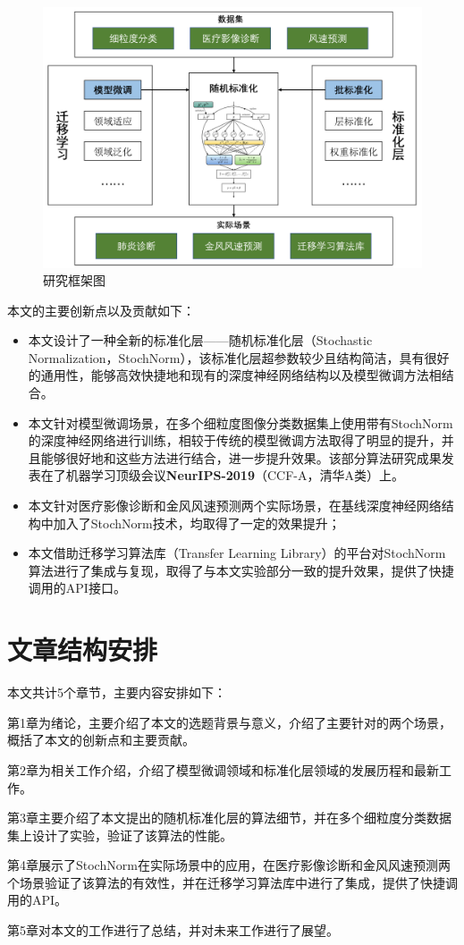 \begin{figure}
    \centering
    \includegraphics[width=\linewidth]{figures/绪论/arch.png}
    \caption{研究框架图}
    \label{fig:research}
\end{figure}

本文的主要创新点以及贡献如下：
\begin{itemize}
    \item 本文设计了一种全新的标准化层——随机标准化层（Stochastic Normalization，StochNorm），该标准化层超参数较少且结构简洁，具有很好的通用性，能够高效快捷地和现有的深度神经网络结构以及模型微调方法相结合。
    \item 本文针对模型微调场景，在多个细粒度图像分类数据集上使用带有StochNorm的深度神经网络进行训练，相较于传统的模型微调方法取得了明显的提升，并且能够很好地和这些方法进行结合，进一步提升效果。该部分算法研究成果发表在了机器学习顶级会议\textbf{NeurIPS-2019}（CCF-A，清华A类）上。
    \item 本文针对医疗影像诊断和金风风速预测两个实际场景，在基线深度神经网络结构中加入了StochNorm技术，均取得了一定的效果提升；
    \item 本文借助迁移学习算法库（Transfer Learning Library）的平台对StochNorm算法进行了集成与复现，取得了与本文实验部分一致的提升效果，提供了快捷调用的API接口。
\end{itemize}

\section{文章结构安排}
本文共计5个章节，主要内容安排如下：

第1章为绪论，主要介绍了本文的选题背景与意义，介绍了主要针对的两个场景，概括了本文的创新点和主要贡献。

第2章为相关工作介绍，介绍了模型微调领域和标准化层领域的发展历程和最新工作。

第3章主要介绍了本文提出的随机标准化层的算法细节，并在多个细粒度分类数据集上设计了实验，验证了该算法的性能。

第4章展示了StochNorm在实际场景中的应用，在医疗影像诊断和金风风速预测两个场景验证了该算法的有效性，并在迁移学习算法库中进行了集成，提供了快捷调用的API。

第5章对本文的工作进行了总结，并对未来工作进行了展望。
